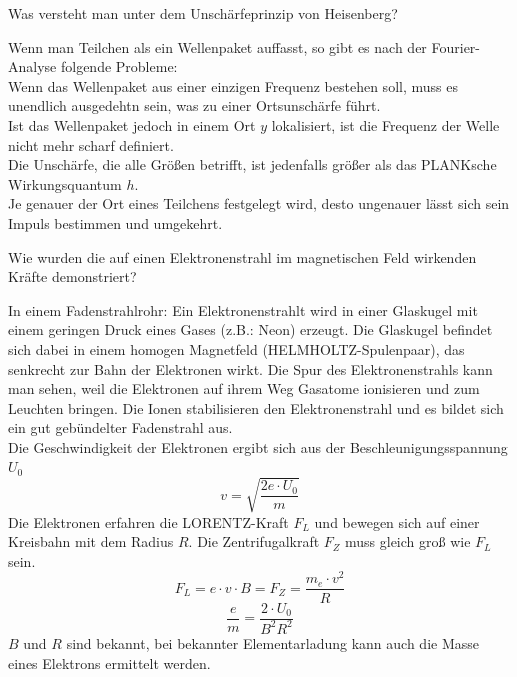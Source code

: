 \documentclass[12pt,a4paper,ngerman]{article}
\begin{document}
\begin{framed}
Was versteht man unter dem Unschärfeprinzip von Heisenberg?
\end{framed}
Wenn man Teilchen als ein Wellenpaket auffasst, so gibt es nach der Fourier-Analyse folgende Probleme: \\
Wenn das Wellenpaket aus einer einzigen Frequenz bestehen soll, muss es unendlich ausgedehtn sein, was zu einer Ortsunschärfe führt. \\
Ist das Wellenpaket jedoch in einem Ort $y$ lokalisiert, ist die Frequenz der Welle nicht mehr scharf definiert. \\
Die Unschärfe, die alle Größen betrifft, ist jedenfalls größer als das PLANKsche Wirkungsquantum $h$. \\
Je genauer der Ort eines Teilchens festgelegt wird, desto ungenauer lässt sich sein Impuls bestimmen und umgekehrt. 

\pagebreak

\begin{framed}
Wie wurden die auf einen Elektronenstrahl im magnetischen Feld wirkenden Kräfte demonstriert?
\end{framed}

In einem Fadenstrahlrohr: Ein Elektronenstrahlt wird in einer Glaskugel mit einem geringen Druck eines Gases (z.B.: Neon) erzeugt. Die Glaskugel befindet sich dabei in einem homogen Magnetfeld (HELMHOLTZ-Spulenpaar), das senkrecht zur Bahn der Elektronen wirkt. Die Spur des Elektronenstrahls kann man sehen, weil die Elektronen auf ihrem Weg Gasatome ionisieren und zum Leuchten bringen. Die Ionen stabilisieren den Elektronenstrahl und es bildet sich ein gut gebündelter Fadenstrahl aus. \\
Die Geschwindigkeit der Elektronen ergibt sich aus der Beschleunigungsspannung $U_0$
\begin{equation*}
v = \sqrt{\frac{2 e \cdot U_0}{m}}
\end{equation*}
Die Elektronen erfahren die LORENTZ-Kraft $F_L$ und bewegen sich auf einer Kreisbahn mit dem Radius $R$. Die Zentrifugalkraft $F_Z$ muss gleich groß wie $F_L$ sein. 
\begin{equation*}
F_L = e \cdot v \cdot B = F_Z = \frac{m_e \cdot v^2}{R}
\end{equation*}
\begin{equation*}
\frac{e}{m} = \frac{2 \cdot U_0}{B^2R^2}
\end{equation*}
$B$ und $R$ sind bekannt, bei bekannter Elementarladung kann auch die Masse eines Elektrons ermittelt werden. 
\end{document}
